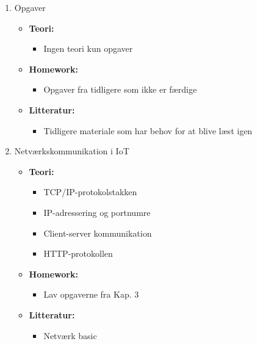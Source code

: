 \documentclass[12pt,a4paper]{article}
\begin{document}
\begin{enumerate}[leftmargin=*, label=\textbf{Dag \arabic* (3 timer)}]
	\item Opgaver
	\begin{itemize}
		\item \textbf{Teori:}
		\begin{itemize}
			\item Ingen teori kun opgaver
		\end{itemize}
		\item  \textbf{Homework:}
		\begin{itemize}
			\item Opgaver fra tidligere som ikke er færdige
		\end{itemize}
		\item \textbf{Litteratur:}
		\begin{itemize}
			\item Tidligere materiale som har behov for at blive læst igen
		\end{itemize}
	\end{itemize}	
	
	\item Netværkskommunikation i IoT
	\begin{itemize}
		\item \textbf{Teori:}
		\begin{itemize}
			\item TCP/IP-protokolstakken
			\item IP-adressering og portnumre
			\item Client-server kommunikation
			\item HTTP-protokollen
		\end{itemize}
		\item  \textbf{Homework:}
		\begin{itemize}
			\item Lav opgaverne fra Kap. 3
		\end{itemize}
		\item \textbf{Litteratur:}
		\begin{itemize}
			\item Netværk basic
		\end{itemize}
	\end{itemize}
	

\end{enumerate}
\end{document}
